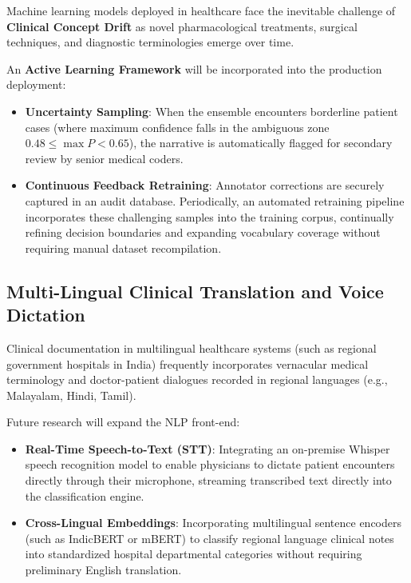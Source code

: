 Machine learning models deployed in healthcare face the inevitable challenge of \textbf{Clinical Concept Drift} as novel pharmacological treatments, surgical techniques, and diagnostic terminologies emerge over time.

An \textbf{Active Learning Framework} will be incorporated into the production deployment:
\begin{itemize}
    \item \textbf{Uncertainty Sampling}: When the ensemble encounters borderline patient cases (where maximum confidence falls in the ambiguous zone $0.48 \le \max P < 0.65$), the narrative is automatically flagged for secondary review by senior medical coders.
    \item \textbf{Continuous Feedback Retraining}: Annotator corrections are securely captured in an audit database. Periodically, an automated retraining pipeline incorporates these challenging samples into the training corpus, continually refining decision boundaries and expanding vocabulary coverage without requiring manual dataset recompilation.
\end{itemize}

\subsection{Multi-Lingual Clinical Translation and Voice Dictation}

Clinical documentation in multilingual healthcare systems (such as regional government hospitals in India) frequently incorporates vernacular medical terminology and doctor-patient dialogues recorded in regional languages (e.g., Malayalam, Hindi, Tamil).

Future research will expand the NLP front-end:
\begin{itemize}
    \item \textbf{Real-Time Speech-to-Text (STT)}: Integrating an on-premise Whisper speech recognition model to enable physicians to dictate patient encounters directly through their microphone, streaming transcribed text directly into the classification engine.
    \item \textbf{Cross-Lingual Embeddings}: Incorporating multilingual sentence encoders (such as IndicBERT or mBERT) to classify regional language clinical notes into standardized hospital departmental categories without requiring preliminary English translation.
\end{itemize}
